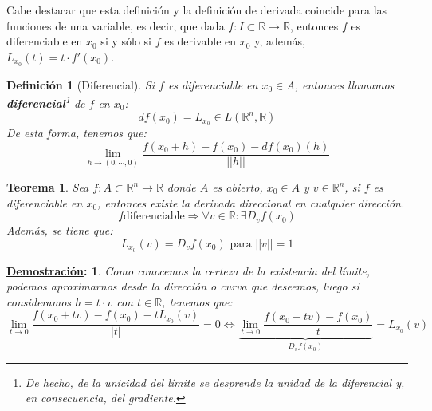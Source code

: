 \documentclass[10pt,a4paper,openright]{book}
\theoremstyle{break}
\newtheorem*{defi}{Definición}
\newtheorem*{theo}{Teorema}
\newtheorem*{demo}{\underline{Demostración}:}
\begin{document}
Cabe destacar que esta definición y la definición de derivada coincide para las funciones de una variable, es decir, que dada $f: I \subset \mathbb{R} \to \mathbb{R}$, entonces $f$ es diferenciable en $x_0$ si y sólo si $f$ es derivable en $x_0$ y, además, $L_{x_0} (t) = t \cdot f'(x_0)$.

\begin{defi}[Diferencial]
Si $f$ es diferenciable en $x_0\in A$, entonces llamamos \textbf{diferencial}\footnote{De hecho, de la unicidad del límite se desprende la unidad de la diferencial y, en consecuencia, del gradiente.} de $f$ en $x_0$:
$$df(x_0) = L_{x_0}\in L(\mathbb{R}^n, \mathbb{R})$$
De esta forma, tenemos que:
$$\lim_{h\rightarrow (0,\cdots, 0)} \frac{f(x_0+h) -f(x_0) -df(x_0)(h)}{||h||}$$
\end{defi}

\begin{theo}
Sea $f: A \subset \mathbb{R}^n \to \mathbb{R}$ donde $A$ es abierto, $x_0 \in A$ y $v \in \mathbb{R}^n$, si $f$ es diferenciable en $x_0$, entonces existe la derivada direccional en cualquier dirección.
$$f \mbox{diferenciable} \Rightarrow \forall v \in \mathbb R: \exists D_vf(x_0)$$
Además, se tiene que:
$$L_{x_0}(v)= D_v f(x_0) \mbox{ para } ||v|| = 1$$
\end{theo}
\begin{demo}
Como conocemos la certeza de la existencia del límite, podemos aproximarnos desde la dirección o curva que deseemos, luego si consideramos $h = t \cdot v$  con $t \in \mathbb{R}$, tenemos que:
$$\lim_{t\rightarrow 0} \frac{f(x_0 + tv) - f(x_0) - tL_{x_0} (v)}{|t|} = 0 \Leftrightarrow  \underbrace{\lim_{t\rightarrow 0} \frac{f(x_0 + tv) - f(x_0)}{t}}_{D_vf(x_0)} = L_{x_0}(v)$$
\end{demo}
\end{document}
